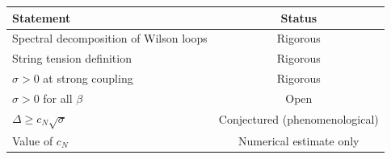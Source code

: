 \begin{center}
\begin{tabular}{|l|c|}
\hline
\textbf{Statement} & \textbf{Status} \\
\hline
Spectral decomposition of Wilson loops & Rigorous \\
String tension definition & Rigorous \\
$\sigma > 0$ at strong coupling & Rigorous \\
$\sigma > 0$ for all $\beta$ & Open \\
$\Delta \geq c_N \sqrt{\sigma}$ & Conjectured (phenomenological) \\
Value of $c_N$ & Numerical estimate only \\
\hline
\end{tabular}
\end{center}


